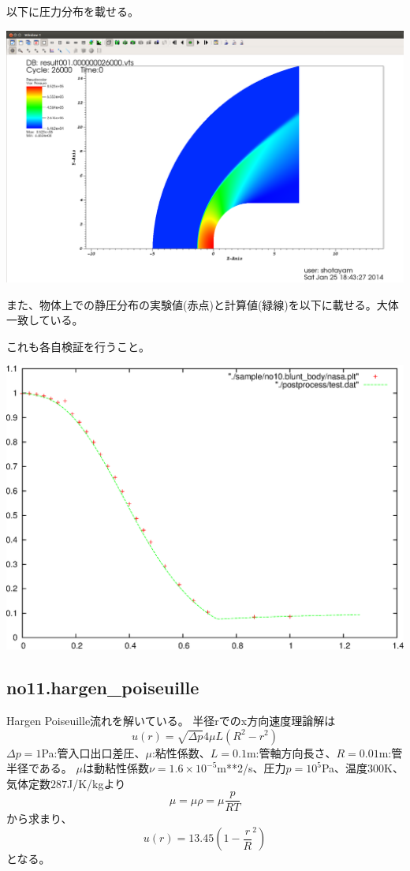 \documentclass{jsarticle}
\begin{document}
以下に圧力分布を載せる。
\begin{center}
\includegraphics[width=.9\textwidth,bb=0 0 1664 1056]{sample/no10.png}
\end{center}
また、物体上での静圧分布の実験値(赤点)と計算値(緑線)を以下に載せる。大体一致している。

これも各自検証を行うこと。
\begin{center}
\includegraphics[width=.6\textwidth]{sample/no10.1.eps}
\end{center}
\subsection{no11.hargen\_poiseuille}%
Hargen Poiseuille流れを解いている。
半径rでのx方向速度理論解は
\begin{equation}
u(r)=\sqrt{\Delta p}{4\mu L}(R^2-r^2)
\end{equation}
$\Delta p=1$Pa:管入口出口差圧、$\mu$:粘性係数、$L=0.1$m:管軸方向長さ、$R=0.01$m:管半径である。
$\mu$は動粘性係数$\nu=1.6\times 10^{-5}$m**2/s、圧力$p=10^5$Pa、温度$300$K、気体定数$287$J/K/kgより
\begin{equation}
\mu=\mu \rho=\mu \frac{p}{RT}
\end{equation}
から求まり、
\begin{equation}
u(r)=13.45(1-{\frac{r}{R}}^2)
\end{equation}
となる。
\end{document}
